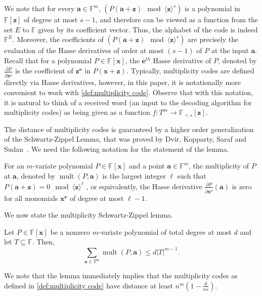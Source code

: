 \documentclass{article}
\def\Field{\mathbb{F}}
\let\F\Field
\def\abs#1{\left| #1 \right|}
\def\veca{\mathbf{a}}
\def\vece{\mathbf{e}}
\def\vecx{\mathbf{x}}
\def\vecz{\mathbf{z}}
\newcommand{\hpartial}{{\bar{\partial}}}
\newcommand{\mult}{\operatorname{mult}}
\newcommand{\vz}{\vecz}
\newcommand{\vx}{\vecx}
\newcommand{\ve}{\vece}
\newcommand{\va}{\veca}
\begin{document}
	\begin{remark}We note that for every $\va \in \F^m$, $\left( P(\va + \vz) \mod
		\langle \vz \rangle^s \right)$ is a polynomial in $\F[\vz]$ of
		degree at most $s-1$, and therefore can be viewed as a function from the
		set $E$ to $\F$ given by its coefficient vector. Thus, the alphabet of
		the code is indeed $\F^E$. Moreover, the coefficients of $\left( P(\va
		+ \vz) \mod \langle \vz \rangle^s \right)$ are precisely the
		evaluation of the Hasse derivatives of order at most $(s-1)$ of $P$ at
		the input $\va$. Recall that for a polynomial $P \in \mathbb{F}[\vx]$,
		the $\ve^{th}$ Hasse derivative of $P$, denoted by $\frac{\hpartial
			P}{\hpartial \vx^{\ve}}$ is the coefficient of $\vz^{\ve}$ in
		$P(\vx+\vz)$. Typically, multiplicity codes are defined directly via
		Hasse derivatives, however, in this paper, it is notationally more
		convenient to work with \cref{def:multiplicity code}. Observe that
		with this notation, it is natural to think of a received word (an
		input to the decoding algorithm for multiplicity codes) as being given
		as a function $f\colon T^m \to \F_{<s}[\vz]$. 
	\end{remark}
	
	The distance of multiplicity codes is guaranteed by a higher order
	generalization of the Schwartz-Zippel Lemma, that was proved by Dvir,
	Kopparty, Saraf and Sudan~\cite{DvirKSS2013}. We need the following
	notation for the statement of the lemma.
	\begin{definition} For an $m$-variate
		polynomial $P \in \F[\vx]$ and a point $\va \in \F^m$, the
		multiplicity of $P$ at $\va$, denoted by $\mult(P, \va)$ is the
		largest integer $\ell$ such that $P(\va + \vz) = 0 \mod \langle \vz
		\rangle^{\ell}$ , or equivalently, the Hasse derivative
		$\frac{\hpartial P}{\hpartial \vx^{\ve}}(\va)$ is zero for all
		monomials $\vx^{\ve}$ of degree at most $\ell -1$.
	\end{definition}
	
	We now state the multiplicity Schwartz-Zippel lemma. 
	
	\begin{lemma}
		Let $P \in \F[\vx]$ be a nonzero $m$-variate polynomial of total degree at most $d$ and let $T \subseteq \F$. Then, \[ \sum_{\va \in T^m} \mult(P, \va) \leq d  \abs{T}^{m-1}.\] 
	\end{lemma}
	We note that the lemma immediately implies that the multiplicity codes
	as defined in \cref{def:multiplicity code} have distance at least $n^m
	(1-\frac{d}{ns})$.
	
\end{document}
